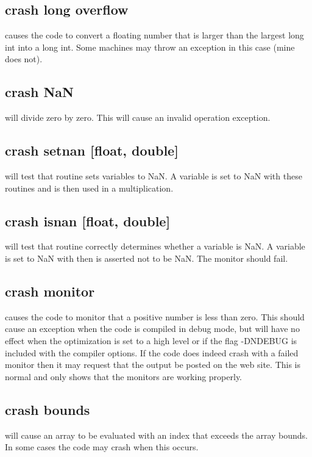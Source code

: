 \subsection{crash long overflow} causes the code to convert a floating number that
is larger than the largest long int into a long int.  Some machines may
throw an exception in this case (mine does not).

\subsection{crash NaN} will divide zero by zero.  This will cause an invalid operation
exception.

\subsection{crash setnan [float, double]} will test that routine  sets
variables to NaN.  A variable is set
to NaN with these routines and is then used in a multiplication.

\subsection{crash isnan [float, double]} will test that routine  correctly
determines whether a variable is NaN.  A variable is set to NaN with
then is asserted not to be NaN.  The monitor should fail.

\subsection{crash monitor} causes the code to monitor that a positive number is less
than zero.  This should cause an exception when the code is compiled in
debug mode, but will have no effect when the optimization is set to a high
level or if the flag -DNDEBUG is included with the compiler options.  If
the code does indeed crash with a failed monitor then it may request that
the output be posted on the web site.  This is normal and only shows that
the monitors are working properly.

\subsection{crash bounds} will cause an array to be evaluated with an index that
exceeds the array bounds.  In some cases the code may crash when this occurs.

